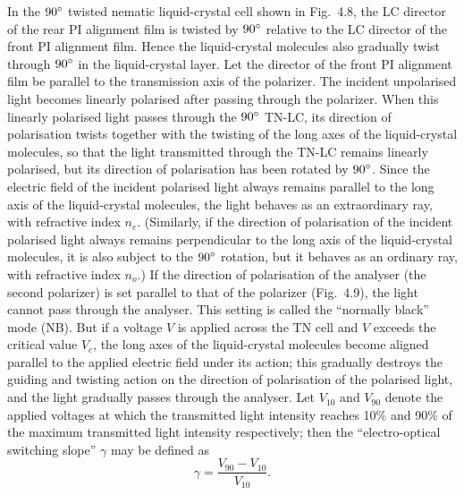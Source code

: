 In the $90^{\circ}$ twisted nematic liquid-crystal cell shown in Fig.~4.8, the LC director of the rear PI alignment film is twisted by $90^{\circ}$ relative to the LC director of the front PI alignment film. Hence the liquid-crystal molecules also gradually twist through $90^{\circ}$ in the liquid-crystal layer. Let the director of the front PI alignment film be parallel to the transmission axis of the polarizer. The incident unpolarised light becomes linearly polarised after passing through the polarizer. When this linearly polarised light passes through the $90^{\circ}$ TN-LC, its direction of polarisation twists together with the twisting of the long axes of the liquid-crystal molecules, so that the light transmitted through the TN-LC remains linearly polarised, but its direction of polarisation has been rotated by $90^{\circ}$. Since the electric field of the incident polarised light always remains parallel to the long axis of the liquid-crystal molecules, the light behaves as an extraordinary ray, with refractive index $n_e$. (Similarly, if the direction of polarisation of the incident polarised light always remains perpendicular to the long axis of the liquid-crystal molecules, it is also subject to the $90^{\circ}$ rotation, but it behaves as an ordinary ray, with refractive index $n_o$.) If the direction of polarisation of the analyser (the second polarizer) is set parallel to that of the polarizer (Fig.~4.9), the light cannot pass through the analyser. This setting is called the ``normally black'' mode (NB). But if a voltage $V$ is applied across the TN cell and $V$ exceeds the critical value $V_c$, the long axes of the liquid-crystal molecules become aligned parallel to the applied electric field under its action; this gradually destroys the guiding and twisting action on the direction of polarisation of the polarised light, and the light gradually passes through the analyser. Let $V_{10}$ and $V_{90}$ denote the applied voltages at which the transmitted light intensity reaches 10\% and 90\% of the maximum transmitted light intensity respectively; then the ``electro-optical switching slope'' $\gamma$ may be defined as
\begin{equation*}
\gamma=\frac{V_{90}-V_{10}}{V_{10}}.
\end{equation*}
